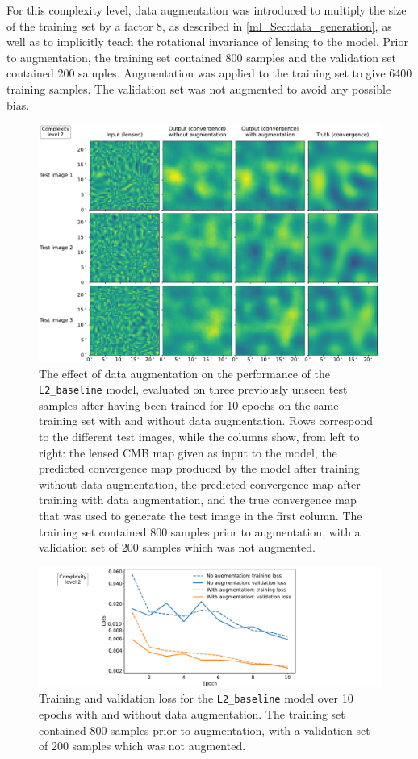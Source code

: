 For this complexity level, data augmentation was introduced to multiply the size of the training set by a factor 8, as described in \autoref{ml_Sec:data_generation}, as well as to implicitly teach the rotational invariance of lensing to the model. Prior to augmentation, the training set contained 800 samples and the validation set contained 200 samples. Augmentation was applied to the training set to give 6400 training samples. The validation set was not augmented to avoid any possible bias.

\begin{figure}[p]%
\includegraphics[width=\textwidth]{v2augtest_3x4}
\caption{The effect of data augmentation on the performance of the \texttt{L2\_baseline} model, evaluated on three previously unseen test samples after having been trained for 10 epochs on the same training set with and without data augmentation.
Rows correspond to the different test images, while the columns show, from left to right: the lensed CMB map given as input to the model, the predicted convergence map produced by the model after training without data augmentation, the predicted convergence map after training with data augmentation, and the true convergence map that was used to generate the test image in the first column. The training set contained 800 samples prior to augmentation, with a validation set of 200 samples which was not augmented.}
\label{ml_Fig:v2augtest_3x4}
\end{figure}

\begin{figure}[p]%
\includegraphics[width=\textwidth]{v2augtest_loss}
\caption{Training and validation loss for the \texttt{L2\_baseline} model over 10 epochs with and without data augmentation. The training set contained 800 samples prior to augmentation, with a validation set of 200 samples which was not augmented.}
\label{ml_Fig:v2augtest_loss}
\end{figure}


